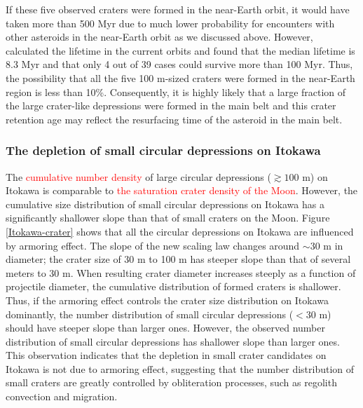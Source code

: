 \documentclass[3p,authoryear]{elsarticle}
\newcommand{\red}[1]{\textcolor{red}{#1}}
\begin{document}
If these five observed craters were formed in the near-Earth orbit, it would have taken more than 500 Myr due to much lower probability for encounters with other asteroids in the near-Earth orbit as we discussed above.
However, \citet{michel2005} calculated the lifetime in the current orbits and found that the median lifetime is 8.3 Myr and that only 4 out of 39 cases could survive more than 100 Myr.
Thus, the possibility that all the five 100 m-sized craters were formed in the near-Earth region is less than 10\%.
Consequently, it is highly likely that a large fraction of the large crater-like depressions were formed in the main belt and this crater retention age may reflect the resurfacing  time of the asteroid in the main belt.
\begin{comment}
This has an important implication for resurfacing on Itokawa in its near-Earth orbit.
Although many NEAs, such as Q-type asteroids, may experienced major resurfacing presumably due to tidal force upon close encounters to terrestrial planets ({binzel2010}), Itokawa probably did not experience such extensive resurfacing after it entered its near-Earth orbit.
Otherwise, its crater retention age would be much younger.
\end{comment}

 \subsubsection{The depletion of small circular depressions on Itokawa}
The \red{cumulative number density} of large circular depressions ($\gtrsim 100$ m) on Itokawa is comparable to \red{the saturation crater density of the Moon}.
However, the cumulative size distribution of small circular depressions on Itokawa has a significantly shallower slope than that of small craters on the Moon.
Figure \ref{Itokawa-crater} shows that all the circular depressions on Itokawa are influenced by armoring effect.
The slope of the new scaling law changes around $\sim 30$ m in diameter; the crater size of 30 m to 100 m has steeper slope than that of several meters to 30 m.
When resulting crater diameter increases steeply as a function of projectile diameter, the cumulative distribution of formed craters is shallower. 
Thus, if the armoring effect controls the crater size distribution on Itokawa dominantly, the number distribution of small circular depressions ($< 30$ m) should have steeper slope than larger ones.
However, the observed number distribution of small circular depressions has shallower slope than larger ones.
This observation indicates that the depletion in small crater candidates on Itokawa is not due to armoring effect, suggesting that the number distribution of small craters are greatly controlled by obliteration processes, such as regolith convection and migration.
\end{document}
